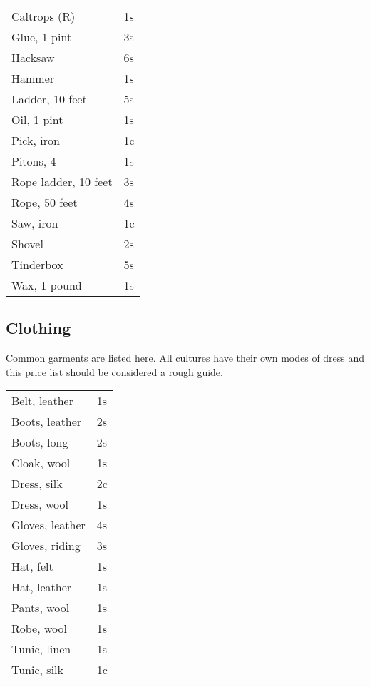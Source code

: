 \begin{center}
{
\begin{xtabular}{|l|l|}
Caltrops (R) & 1s \\
Glue, 1 pint & 3s \\
Hacksaw & 6s \\
Hammer & 1s \\
Ladder, 10 feet & 5s \\
Oil, 1 pint & 1s \\
Pick, iron & 1c \\
Pitons, 4 & 1s \\
Rope ladder, 10 feet & 3s \\
Rope, 50 feet & 4s \\
Saw, iron & 1c \\
Shovel & 2s \\
Tinderbox & 5s \\
Wax, 1 pound & 1s \\
\hline
\end{xtabular}
}
\end{center}

\subsection{Clothing}

Common garments are listed here. All cultures have their own modes of dress and this price list should be considered a rough guide.

\begin{center}
{
\begin{xtabular}{|l|l|}
Belt, leather & 1s \\
Boots, leather & 2s \\
Boots, long & 2s \\
Cloak, wool & 1s \\
Dress, silk & 2c \\
Dress, wool & 1s \\
Gloves, leather & 4s \\
Gloves, riding & 3s \\
Hat, felt & 1s \\
Hat, leather & 1s \\
Pants, wool & 1s \\
Robe, wool & 1s \\
Tunic, linen & 1s \\
Tunic, silk & 1c \\
\hline
\end{xtabular}
}
\end{center}


